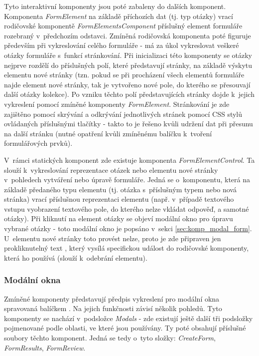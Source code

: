 		Tyto interaktivní komponenty jsou poté zabaleny do dalších komponent. Komponenta \textit{FormElement} na základě příchozích dat (tj. typ otázky) vrací rodičovské komponentě \textit{FormElementsComponent} příslušný element formuláře rozebraný v~předchozím odstavci. Zmíněná rodičovská komponenta poté figuruje především při vykreslování celého formuláře - má za úkol vykreslovat veškeré otázky formuláře s~funkcí stránkování. Při inicializaci této komponenty se otázky nejprve rozdělí do příslušných polí, které představují stránky, na základě výskytu elementu nové stránky (tzn. pokud se při procházení všech elementů formuláře najde element nové stránky, tak je vytvořeno nové pole, do kterého se přesouvají další otázky kolekce). Po vzniku těchto polí představujících stránky dojde k~jejich vykreslení pomocí zmíněné komponenty \textit{FormElement}. Stránkování je zde zajištěno pomocí skrývání a odkrývání jednotlivých stránek pomocí CSS stylů ovládaných příslušnými tlačítky - takto to je řešeno kvůli udržení dat při přesunu na další stránku (nutné opatření kvůli zmíněnému balíčku k~tvoření formulářových prvků).
		
		V~rámci statických komponent zde existuje komponenta \textit{FormElementControl}. Ta slouží k~vykreslování reprezentace otázek nebo elementu nové stránky v~pohledech vytváření nebo úpravě formuláře. Jedná se o~komponentu, která na základě předaného typu elementu (tj. otázka s~příslušným typem nebo nová stránka) vrací příslušnou reprezentaci elementu (např. v~případě textového vstupu vyobrazení textového pole, do kterého nelze vkládat odpověď, a samotné otázky). Při kliknutí na element otázky se objeví modální okno pro úpravu vybrané otázky - toto modální okno je popsáno v~sekci \ref{sec:komp_modal_form}. U~elementu nové stránky toto provést nelze, proto je zde připraven jen prokliknutelný text , který vysílá specifickou událost do rodičovské komponenty, která ho používá (slouží k~odebrání elementu).
	
		\subsubsection{Modální okna} \label{sec:komp_modal} %
		Zmíněné komponenty představují předpis vykreslení pro modální okna spravovaná balíčkem . Na jejich funkčnosti závisí několik pohledů. Tyto komponenty se nachází v~podsložce \textit{Modals} - zde existují ještě další tři podsložky pojmenované podle oblasti, ve které jsou používány. Ty poté obsahují příslušné soubory těchto komponent. Jedná se tedy o~tyto složky: \textit{CreateForm}, \textit{FormResults}, \textit{FormReview}. 
		
